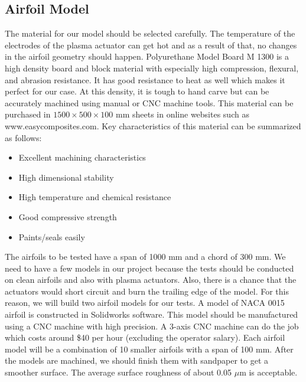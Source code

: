 \documentclass[fleqn,10pt]{SelfArx} %
\begin{document}
\subsection{Airfoil Model}
The material for our model should be selected carefully. The temperature of the electrodes of the plasma actuator can get hot and as a result of that, no changes in the airfoil geometry should happen.  Polyurethane Model Board M 1300 is a high density board and block material with especially high compression, flexural, and abrasion resistance. It has good resistance to heat as well which makes it perfect for our case. At this density, it is tough to hand carve but can be accurately machined using manual or CNC machine tools. This material can be purchased in $1500\times 500 \times 100$ mm sheets in online websites such as www.easycomposites.com. Key characteristics of this material can be summarized as follows:
\begin{itemize}
\item Excellent machining characteristics
\item High dimensional stability
\item High temperature and chemical resistance
\item Good compressive strength
\item Paints/seals easily
\end{itemize}

The airfoils to be tested have a span of 1000 mm and a chord of 300 mm. We need to have a few models in our project because the tests should be conducted on clean airfoils and also with plasma actuators. Also, there is a chance that the actuators would short circuit and burn the trailing edge of the model. For this reason, we will build two airfoil models for our tests. A model of NACA 0015 airfoil is constructed in Solidworks software. This model should be manufactured using a CNC machine with high precision. A 3-axis CNC machine can do the job which costs around \$40 per hour (excluding the operator salary). Each airfoil model will be a combination of 10 smaller airfoils with a span of 100 mm. After the models are machined, we should finish them with sandpaper to get a smoother surface. The average surface roughness of about 0.05 $\mu$m is acceptable.
\end{document}
